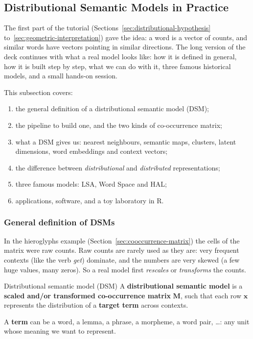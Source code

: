 \subsection{Distributional Semantic Models in Practice}
\label{sec:dsm-in-practice}

The first part of the tutorial (Sections~\ref{sec:distributional-hypothesis}
to~\ref{sec:geometric-interpretation}) gave the idea: a word is a vector of counts, and
similar words have vectors pointing in similar directions. The long version of the deck
continues with what a real model looks like: how it is defined in general, how it is
built step by step, what we can do with it, three famous historical models, and a small
hands-on session.

This subsection covers:
\begin{enumerate}[nosep]
  \item the general definition of a distributional semantic model (DSM);
  \item the pipeline to build one, and the two kinds of co-occurrence matrix;
  \item what a DSM gives us: nearest neighbours, semantic maps, clusters, latent
        dimensions, word embeddings and context vectors;
  \item the difference between \emph{distributional} and \emph{distributed}
        representations;
  \item three famous models: LSA, Word Space and HAL;
  \item applications, software, and a toy laboratory in R.
\end{enumerate}

\subsubsection{General definition of DSMs}

In the hieroglyphs example (Section~\ref{sec:cooccurrence-matrix}) the cells of the
matrix were raw counts. Raw counts are rarely used as they are: very frequent contexts
(like the verb \emph{get}) dominate, and the numbers are very skewed (a few huge values,
many zeros). So a real model first \emph{rescales} or \emph{transforms} the counts.

\begin{nbdef}{Distributional semantic model (DSM)}
A \textbf{distributional semantic model} is a \textbf{scaled and/or transformed
co-occurrence matrix} $\mathbf{M}$, such that each row $\mathbf{x}$ represents the
distribution of a \textbf{target term} across contexts.

A \textbf{term} can be a word, a lemma, a phrase, a morpheme, a word pair, \ldots: any
unit whose meaning we want to represent.
\end{nbdef}

